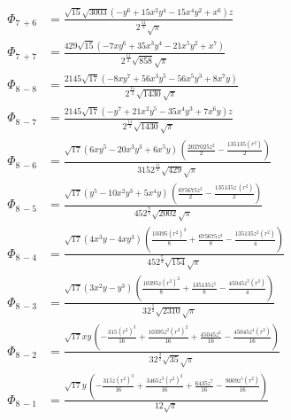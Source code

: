 \documentclass[10pt]{article}
\begin{document}
\begin{align*}
\Phi_{7\, +6} &= \frac{\sqrt{15} \sqrt{3003} \left( -{{y}^{6}}+15 {{x}^{2}} {{y}^{4}}-15 {{x}^{4}} {{y}^{2}}+{{x}^{6}}\right)  z}{{{2}^{\frac{11}{2}}} \sqrt{\ensuremath{\pi} }} \\
\Phi_{7\, +7} &= \frac{429 \sqrt{15} \left( -7 x {{y}^{6}}+35 {{x}^{3}} {{y}^{4}}-21 {{x}^{5}} {{y}^{2}}+{{x}^{7}}\right) }{{{2}^{\frac{11}{2}}} \sqrt{858} \sqrt{\ensuremath{\pi} }} \\
%
\Phi_{8\, -8} &= \frac{2145 \sqrt{17} \left( -8 x {{y}^{7}}+56 {{x}^{3}} {{y}^{5}}-56 {{x}^{5}} {{y}^{3}}+8 {{x}^{7}} y\right) }{{{2}^{\frac{15}{2}}} \sqrt{1430} \sqrt{\ensuremath{\pi} }} \\
\Phi_{8\, -7} &= \frac{2145 \sqrt{17} \left( -{{y}^{7}}+21 {{x}^{2}} {{y}^{5}}-35 {{x}^{4}} {{y}^{3}}+7 {{x}^{6}} y\right)  z}{{{2}^{\frac{11}{2}}} \sqrt{1430} \sqrt{\ensuremath{\pi} }} \\
\Phi_{8\, -6} &= \frac{\sqrt{17} \left( 6 x {{y}^{5}}-20 {{x}^{3}} {{y}^{3}}+6 {{x}^{5}} y\right) \, \left( \frac{2027025 {{z}^{2}}}{2}-\frac{135135 \left( r^2\right) }{2}\right) }{315 {{2}^{\frac{11}{2}}} \sqrt{429} \sqrt{\ensuremath{\pi} }} \\
\Phi_{8\, -5} &= \frac{\sqrt{17} \left( {{y}^{5}}-10 {{x}^{2}} {{y}^{3}}+5 {{x}^{4}} y\right) \, \left( \frac{675675 {{z}^{3}}}{2}-\frac{135135 z\, \left( r^2\right) }{2}\right) }{45 {{2}^{\frac{9}{2}}} \sqrt{2002} \sqrt{\ensuremath{\pi} }} \\
\Phi_{8\, -4} &= \frac{\sqrt{17} \left( 4 {{x}^{3}} y-4 x {{y}^{3}}\right) \, \left( \frac{10395 {{\left( r^2\right) }^{2}}}{8}+\frac{675675 {{z}^{4}}}{8}-\frac{135135 {{z}^{2}} \left( r^2\right) }{4}\right) }{45 {{2}^{\frac{7}{2}}} \sqrt{154} \sqrt{\ensuremath{\pi} }} \\
\Phi_{8\, -3} &= \frac{\sqrt{17} \left( 3 {{x}^{2}} y-{{y}^{3}}\right) \, \left( \frac{10395 z {{\left( r^2\right) }^{2}}}{8}+\frac{135135 {{z}^{5}}}{8}-\frac{45045 {{z}^{3}} \left( r^2\right) }{4}\right) }{3 {{2}^{\frac{5}{2}}} \sqrt{2310} \sqrt{\ensuremath{\pi} }} \\
\Phi_{8\, -2} &= \frac{\sqrt{17} x y\, \left( -\frac{315 {{\left( r^2\right) }^{3}}}{16}+\frac{10395 {{z}^{2}} {{\left( r^2\right) }^{2}}}{16}+\frac{45045 {{z}^{6}}}{16}-\frac{45045 {{z}^{4}} \left( r^2\right) }{16}\right) }{3 {{2}^{\frac{3}{2}}} \sqrt{35} \sqrt{\ensuremath{\pi} }} \\
\Phi_{8\, -1} &= \frac{\sqrt{17} y\, \left( -\frac{315 z {{\left( r^2\right) }^{3}}}{16}+\frac{3465 {{z}^{3}} {{\left( r^2\right) }^{2}}}{16}+\frac{6435 {{z}^{7}}}{16}-\frac{9009 {{z}^{5}} \left( r^2\right) }{16}\right) }{12 \sqrt{\ensuremath{\pi} }} \\

\end{align*}
\end{document}
